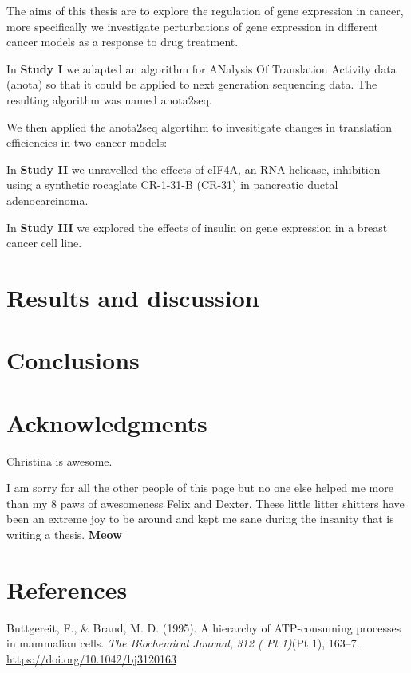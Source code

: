 \documentclass[12pt,openany]{book}
\begin{document}
The aims of this thesis are to explore the regulation of gene expression
in cancer, more specifically we investigate perturbations of gene
expression in different cancer models as a response to drug treatment.

In \textbf{Study I} we adapted an algorithm for ANalysis Of Translation
Activity data (anota) so that it could be applied to next generation
sequencing data. The resulting algorithm was named anota2seq.

We then applied the anota2seq algortihm to invesitigate changes in
translation efficiencies in two cancer models:

In \textbf{Study II} we unravelled the effects of eIF4A, an RNA
helicase, inhibition using a synthetic rocaglate CR-1-31-B (CR-31) in
pancreatic ductal adenocarcinoma.

In \textbf{Study III} we explored the effects of insulin on gene
expression in a breast cancer cell line.

\chapter{Results and discussion}

\chapter{Conclusions}

\chapter*{Acknowledgments}\label{acknowledgments}

Christina is awesome.

I am sorry for all the other people of this page but no one else helped
me more than my 8 paws of awesomeness Felix and Dexter. These little
litter shitters have been an extreme joy to be around and kept me sane
during the insanity that is writing a thesis. \textbf{Meow}

\chapter*{References}\label{references}

\hypertarget{refs}{}
\hypertarget{ref-Buttgereit1995}{}
Buttgereit, F., \& Brand, M. D. (1995). A hierarchy of ATP-consuming
processes in mammalian cells. \emph{The Biochemical Journal}, \emph{312
( Pt 1)}(Pt 1), 163--7. \url{https://doi.org/10.1042/bj3120163}
\end{document}
